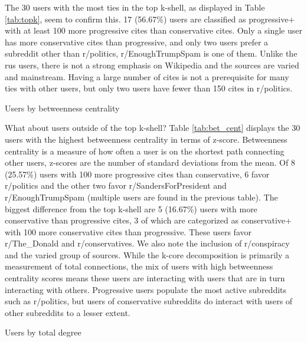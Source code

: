 \documentclass[doublespacing]{utdthesis}
\begin{document}
The 30 users with the most ties in the top k-shell, as displayed in Table \ref{tab:topk}, seem to confirm this.
17 (56.67\%) users are classified as progressive+ with at least 100 more progressive cites than conservative cites.
Only a single user has more conservative cites than progressive, and only two users prefer a subreddit other than r/politics, r/EnoughTrumpSpam is one of them.
Unlike the rus users, there is not a strong emphasis on Wikipedia and the sources are varied and mainstream.
Having a large number of cites is not a prerequisite for many ties with other users, but only two users have fewer than 150 cites in r/politics.

\begin{table}[!ht]
\centering
\scriptsize
\caption{Users by betweenness centrality}

\label{tab:bet_cent}
\end{table}

What about users outside of the top k-shell?
Table \ref{tab:bet_cent} displays the 30 users with the highest betweenness centrality in terms of z-score.
Betweenness centrality is a measure of how often a user is on the shortest path connecting other users, z-scores are the number of standard deviations from the mean.
Of 8 (25.57\%) users with 100 more progressive cites than conservative, 6 favor r/politics and the other two favor r/SandersForPresident and r/EnoughTrumpSpam (multiple users are found in the previous table).
The biggest difference from the top k-shell are 5 (16.67\%) users with more conservative than progressive cites, 3 of which are categorized as conservative+ with 100 more conservative cites than progressive.
These users favor r/The\_Donald and r/conservatives.
We also note the inclusion of r/conspiracy and the varied group of sources.
While the k-core decomposition is primarily a measurement of total connections, the mix of users with high betweenness centrality scores means these users are interacting with users that are in turn interacting with others.
Progressive users populate the most active subreddits such as r/politics, but users of conservative subreddits do interact with users of other subreddits to a lesser extent.

\begin{table}[!ht]
\centering
\scriptsize
\caption{Users by total degree}

\label{tab:tot_deg}
\end{table}
\end{document}
